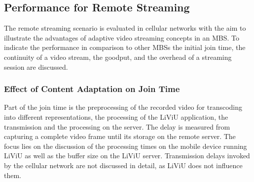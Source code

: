 \subsection{Performance for Remote Streaming}
The remote streaming scenario is evaluated in cellular networks with the aim to illustrate the advantages of adaptive video streaming concepts in an \ac{MBS}.
To indicate the performance in comparison to other \ac{MBS}s the initial join time, the continuity of a video stream, the goodput, and the overhead of a streaming session are discussed.
\subsubsection{Effect of Content Adaptation on Join Time}
Part of the join time is the preprocessing of the recorded video for transcoding into different representations, the processing of the \ac{LiViU} application, the transmission and the processing on the server.
The delay is measured from capturing a complete video frame until its storage on the remote server.
The focus lies on the discussion of the processing times on the mobile device running \ac{LiViU} as well as the buffer size on the \ac{LiViU} server.
Transmission delays invoked by the cellular network are not discussed in detail, as \ac{LiViU} does not influence them.

